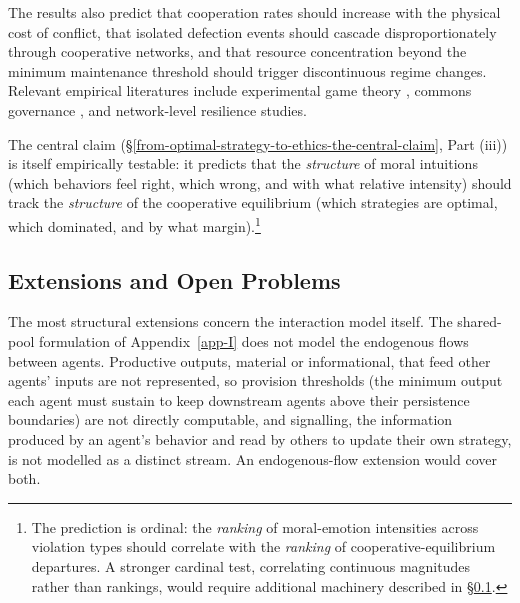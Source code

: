 \documentclass[11pt]{article}
\theoremstyle{plain}
\theoremstyle{definition}
\theoremstyle{remark}
\let\origsubsection\subsection
\renewcommand{\subsection}{\needspace{7\baselineskip}\origsubsection}
\begin{document}
\normalsize

The results also predict that cooperation rates should increase with the
physical cost of conflict, that isolated defection events should cascade
disproportionately through cooperative networks, and that resource
concentration beyond the minimum maintenance threshold should trigger
discontinuous regime changes. Relevant empirical literatures include
experimental game theory \citep{Axelrod1984}, commons governance
\citep{Ostrom1990}, and network-level resilience studies.

The central claim
(§\ref{from-optimal-strategy-to-ethics-the-central-claim}, Part (iii))
is itself empirically testable: it predicts that the \emph{structure} of
moral intuitions (which behaviors feel right, which wrong, and with what
relative intensity) should track the \emph{structure} of the cooperative
equilibrium (which strategies are optimal, which dominated, and by what
margin).\footnote{The prediction is ordinal: the \emph{ranking} of
  moral-emotion intensities across violation types should correlate with
  the \emph{ranking} of cooperative-equilibrium departures. A stronger
  cardinal test, correlating continuous magnitudes rather than rankings,
  would require additional machinery described in
  §\ref{extensions-and-open-problems}.}

\subsection{Extensions and Open
Problems}\label{extensions-and-open-problems}

The most structural extensions concern the interaction model itself. The
shared-pool formulation of Appendix~\ref{app-I} does not model the
endogenous flows between agents. Productive outputs, material or
informational, that feed other agents' inputs are not represented, so
provision thresholds (the minimum output each agent must sustain to keep
downstream agents above their persistence boundaries) are not directly
computable, and signalling, the information produced by an agent's
behavior and read by others to update their own strategy, is not
modelled as a distinct stream. An endogenous-flow extension would cover
both.
\end{document}
